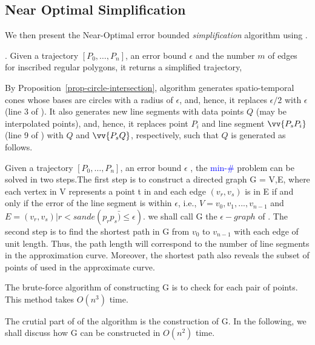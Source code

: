 \subsection{Near Optimal Simplification}
{\color{blue}
We then present the Near-Optimal error bounded {\em simplification} algorithm using \sed.




.
Given a trajectory ${[P_0, \ldots, P_n]}$, an error bound $\epsilon$ and the number $m$ of edges for inscribed
regular polygons, it returns a simplified trajectory,

By Proposition~\ref{prop-circle-intersection}, algorithm \cista generates spatio-temporal cones whose bases are circles with a radius of $\epsilon$,
and, hence, it replaces $\epsilon/2$ with $\epsilon$ (line 3 of \cist). It also generates new line segments with data points $Q$ (may be interpolated points), and,
hence, it replaces point $P_i$ and line segment $\vv{P_sP_i}$  (line 9 of \cist) with $Q$ and $\vv{P_sQ}$, respectively,  such that $Q$ is generated as follows.

Given a trajectory ${[P_0, \ldots, P_n]}$, an error bound $\epsilon$ ,
the  \textcolor{blue}{min-\#}  problem can be solved in two steps.The first step
is to construct a directed graph G = {V,E}, where each vertex in V represents a
point t in  and each edge $(v_r,v_s)$ is in E if and only if the error
of the line segment is within $\epsilon$, i.e., $V = {v_0,v_1,...,v_{n-1}}$ and
$E = {(v_r,v_s) | r < s and e(\bar{p_rp_s) \le \epsilon})}$. we shall call G the
$\epsilon - graph$ of . The second step is to find the shortest path
in G from $v_0$ to $v_{n-1}$ with each edge of unit length. Thus, the path
length will correspond to the number of line segments in the approximation
curve. Moreover, the shortest path also reveals the subset of points of
 used in the approximate curve.


The brute-force algorithm of constructing G is to check for each pair of points.
This method takes $O(n^3)$ time.

The crutial part of of the algorithm is the construction of G. In the following,
we shall discuss how G can be constructed in $O(n^2)$ time.

}
